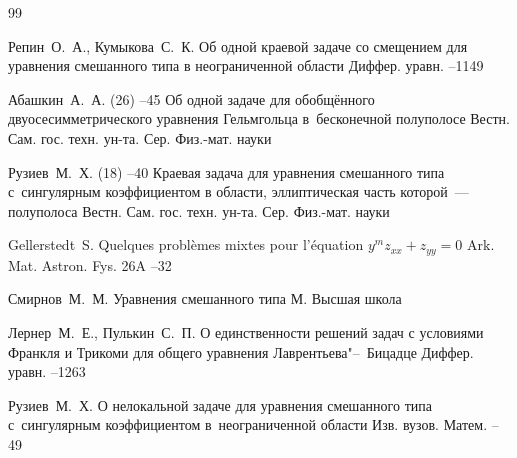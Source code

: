 \begin{thebibliography}{99}


\by Репин~О.~А., Кумыкова~С.~К.
\paper Об одной краевой задаче со смещением для уравнения смешанного типа в неограниченной области
\jour Диффер. уравн.
--1149


\by Абашкин~А.~А.
(26) 
--45
\paper Об одной задаче для обобщённого двуосесимметрического уравнения Гельмгольца в~бесконечной полуполосе
\jour Вестн. Сам. гос. техн. ун-та. Сер. Физ.-мат. науки


\by Рузиев~М.~Х. 
(18) 
--40
\paper Краевая задача для уравнения смешанного типа с~сингулярным коэффициентом в области, эллиптическая часть которой~--- полуполоса
\jour Вестн. Сам. гос. техн. ун-та. Сер. Физ.-мат. науки



\by Gellerstedt~S. 
\paper Quelques probl\`emes mixtes pour l'\'equation ${y^m}{z_{xx}} + {z_{yy}} = 0$ 
\jour Ark. Mat. Astron. Fys.
\vol 26A
--32



\by Смирнов~М.~М.
\book Уравнения смешанного типа
\publaddr М.
\publ Высшая школа


\by Лернер~М.~Е., Пулькин~С.~П.
\paper О единственности решений задач с условиями Франкля и Трикоми для общего уравнения Лаврентьева"--~Бицадце
\jour Диффер. уравн. 
--1263


\by Рузиев~М.~Х.
\paper О нелокальной задаче для уравнения смешанного типа с~сингулярным коэффициентом в~неограниченной области
\jour Изв. вузов. Матем.
--49



\end{thebibliography}
